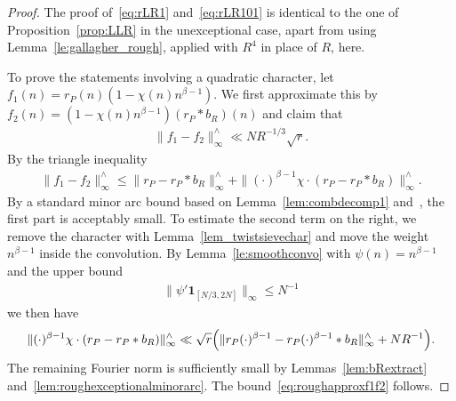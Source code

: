\documentclass[12pt]{amsart}
\theoremstyle{definition}
\theoremstyle{remark}
\numberwithin{equation}{section}
\newcommand{\1}{\mathbf{1}}
\begin{document}
\begin{proof}
    The proof of~\eqref{eq:rLR1} and~\eqref{eq:rLR101} is identical to the one of Proposition~\ref{prop:LLR} in the unexceptional case, apart from using Lemma~\ref{le:gallagher_rough}, applied with $R^4$ in place of $R$, here.

To prove the statements involving a quadratic character, let 
    $f_1(n)=r_{P}(n)(1-\chi(n)n^{\beta-1})$. We first approximate this by $f_2(n)=(1-\chi(n)n^{\beta-1})(r_P*b_{R})(n)$ and claim that
    \begin{align}\label{eq:roughapproxf1f2}
        \|f_1-f_2\|^{\wedge}_\infty \ll N R^{-1/3} \sqrt{r}.
    \end{align}
    By the triangle inequality
    \begin{align*}
         \|f_1-f_2\|^{\wedge}_\infty\leq \|r_P-r_P*b_R\|^{\wedge}_\infty+ \|(\cdot)^{\beta-1}\chi\cdot (r_P-r_P*b_R)\|^{\wedge}_\infty.
    \end{align*}
    By a standard minor arc bound based on Lemma~\ref{lem:combdecomp1} and~\cite[Lemmas 13.7 and 13.8]{iw-kow}, the first part is acceptably small. To estimate the second term on the right, we  remove the character with Lemma~\ref{lem_twistsievechar} and move the weight  $n^{\beta-1}$ inside the convolution. By Lemma~\ref{le:smoothconvo} with $\psi(n)=n^{\beta-1}$ and the upper bound 
    \begin{align*}
        \|\psi'\1_{[N/3,2N]}\|_\infty\leq N^{-1}
    \end{align*}
    we then have 
    \begin{align*}
        \|(\cdot)^{\beta-1}\chi\cdot (r_P-r_P*b_R)\|^{\wedge}_\infty \ll \sqrt{r} \Bigl(\|r_P (\cdot)^{\beta-1}-r_P(\cdot)^{\beta-1}*b_R\|^{\wedge}_\infty+NR^{-1}\Bigr).
    \end{align*}
    The remaining Fourier norm is sufficiently small by Lemmas~\ref{lem:bRextract} and~\ref{lem:roughexceptionalminorarc}. The bound~\eqref{eq:roughapproxf1f2} follows.
    

\end{proof}
\end{document}
